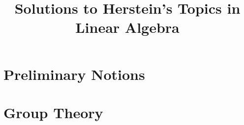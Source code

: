 \documentclass[11pt]{article}
\begin{document}
    \title{Solutions to Herstein's Topics in Linear Algebra}
    \maketitle

    \section{Preliminary Notions}
    \section{Group Theory}
\end{document}
